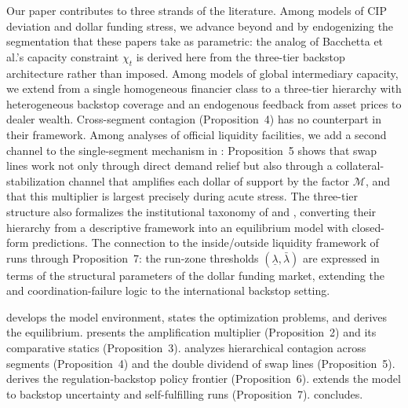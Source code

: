 Our paper contributes to three strands of the literature. Among models of CIP deviation and
dollar funding stress, we advance beyond \citet{DuTepperVerdelhan2018} and
\citet{BacchettaDavisVanWincoop2025} by endogenizing the segmentation that these papers take as
parametric: the analog of Bacchetta et al.'s capacity constraint $\chi_t$ is derived here from
the three-tier backstop architecture rather than imposed. Among models of global intermediary
capacity, we extend \citet{GabaixMaggori2015} from a single homogeneous financier class to a
three-tier hierarchy with heterogeneous backstop coverage and an endogenous feedback from asset
prices to dealer wealth. Cross-segment contagion (Proposition~4) has no counterpart in their
framework. Among analyses of official liquidity facilities, we add a second channel to the
single-segment mechanism in \citet{CesaBianchiEgurenMartinFerrero2025}: Proposition~5 shows that
swap lines work not only through direct demand relief but also through a collateral-stabilization
channel that amplifies each dollar of support by the factor $\mathcal{M}$, and that this multiplier is
largest precisely during acute stress. The three-tier structure also formalizes the institutional
taxonomy of \citet{MurauPapePforr2023} and \citet{Mehrling2021}, converting their hierarchy from
a descriptive framework into an equilibrium model with closed-form predictions. The connection to
the inside/outside liquidity framework of \citet{HolmstromTirole1998} runs through Proposition~7:
the run-zone thresholds $(\underline\lambda, \bar\lambda)$ are expressed in terms of the structural
parameters of the dollar funding market, extending the \citet{DiamondDybvig1983} and
\citet{ChangVelasco2001} coordination-failure logic to the international backstop setting.

 develops the model environment, states the
optimization problems, and derives the equilibrium.  presents the amplification
multiplier (Proposition~2) and its comparative statics (Proposition~3). 
analyzes hierarchical contagion across segments (Proposition~4) and the double dividend of
swap lines (Proposition~5).  derives the regulation-backstop policy frontier
(Proposition~6).  extends the model to backstop uncertainty and self-fulfilling
runs (Proposition~7).  concludes.
